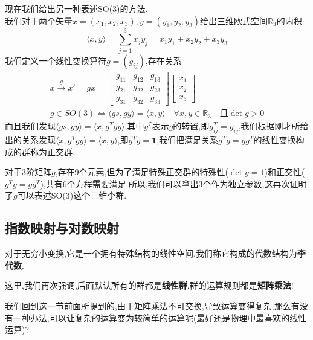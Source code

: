 {    现在我们给出另一种表述SO(3)的方法.\\
    我们对于两个矢量$x=(x_1,x_2,x_3),y=(y_1,y_2,y_3)$给出三维欧式空间$\mathbb{R}_3$的内积:
    \begin{equation}
        \langle x,y\rangle=\sum_{j=1}^{3}x_j y_j=x_1y_1+x_2y_2+x_3y_3
    \end{equation}
    我们定义一个线性变换算符$g=(g_{ij})$,存在关系
    \begin{equation}
        \begin{aligned}
            x\xrightarrow{g}x'=gx=\begin{bmatrix}g_{11}&g_{12}&g_{13}\\g_{21}&g_{22}&g_{23}\\g_{31}&g_{32}&g_{33}\end{bmatrix}\begin{bmatrix}x_1\\x_2\\x_3\end{bmatrix}\\ g\in SO(3)\Leftrightarrow\langle gs,gy\rangle=\langle x,y\rangle\quad\forall x,y\in\mathbb{R}_3\quad\text{且}\det g>0
        \end{aligned}
    \end{equation}
    而且我们发现$\langle gs,gy\rangle=\langle x,g^Tgy\rangle$,其中$g^T$表示$g$的转置,即$g_{ij}^T=g_{ij}$,我们根据刚才所给出的关系发现$\langle x,g^Tgy\rangle=\langle x,y\rangle$,即$g^Tg=\textbf{1}$,我们把满足关系$g^Tg=gg^T$的线性变换构成的群称为正交群.
    
    对于3阶矩阵$g$,存在9个元素,但为了满足特殊正交群的特殊性($\det g=1$)和正交性($g^Tg=gg^T$),共有6个方程需要满足.所以,我们可以拿出3个作为独立参数,这再次证明了$g$可以表述SO(3)这个三维李群.
    }

    
\subsection{指数映射与对数映射}
对于无穷小变换,它是一个拥有特殊结构的线性空间,我们称它构成的代数结构为\textbf{李代数}.

这里,我们再次强调,后面默认所有的群都是\textbf{线性群},群的运算规则都是\textbf{矩阵乘法}!

我们回到这一节前面所提到的,由于矩阵乘法不可交换,导致运算变得复杂,那么有没有一种办法,可以让复杂的运算变为较简单的运算呢(最好还是物理中最喜欢的线性运算)?

